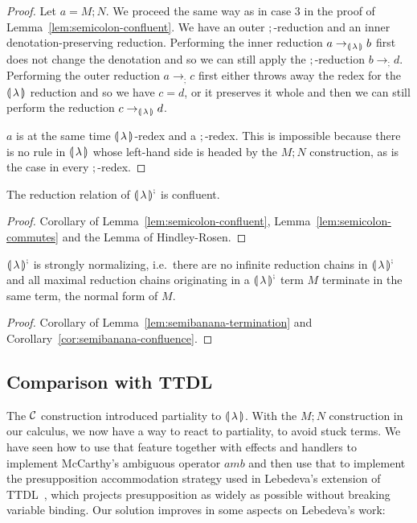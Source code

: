 \begin{proof}
    Let $a = M; N$. We proceed the same way as in case 3 in the proof of
    Lemma~\ref{lem:semicolon-confluent}. We have an outer $;$-reduction and
    an inner denotation-preserving reduction. Performing the inner
    reduction $a \to_{\llparenthesis \, \lambda \, \rrparenthesis} b$ first does not change the denotation and so
    we can still apply the $;$-reduction $b \to_; d$. Performing the outer
    reduction $a \to_; c$ first either throws away the redex for the
    ${\llparenthesis \, \lambda \, \rrparenthesis}$ reduction and so we have $c = d$, or it preserves it whole and
    then we can still perform the reduction $c \to_{\llparenthesis \, \lambda \, \rrparenthesis} d$.

  \item $a$ is at the same time ${\llparenthesis \, \lambda \, \rrparenthesis}$-redex and a $;$-redex. This is
    impossible because there is no rule in ${\llparenthesis \, \lambda \, \rrparenthesis}$ whose left-hand side is
    headed by the $M; N$ construction, as is the case in every $;$-redex.
\end{proof}

\begin{corollary}\label{cor:semibanana-confluence}
  
  The reduction relation of ${\llparenthesis \, \lambda \, \rrparenthesis}^;$ is confluent.
\end{corollary}

\begin{proof}
  Corollary of Lemma~\ref{lem:semicolon-confluent},
  Lemma~\ref{lem:semicolon-commutes} and the Lemma of Hindley-Rosen.
\end{proof}

\begin{theorem}

  ${\llparenthesis \, \lambda \, \rrparenthesis}^;$ is strongly normalizing, i.e.\ there are no infinite reduction
  chains in ${\llparenthesis \, \lambda \, \rrparenthesis}^;$ and all maximal reduction chains originating in a
  ${\llparenthesis \, \lambda \, \rrparenthesis}^;$ term $M$ terminate in the same term, the normal form of $M$.
\end{theorem}

\begin{proof}
  Corollary of Lemma~\ref{lem:semibanana-termination} and
  Corollary~\ref{cor:semibanana-confluence}.
\end{proof}


\subsection{Comparison with TTDL}
\label{ssec:comparison-ttdl}

The $\mathcal{C}$ construction introduced partiality to ${\llparenthesis \, \lambda \, \rrparenthesis}$. With the $M; N$
construction in our calculus, we now have a way to react to partiality, to
avoid stuck terms. We have seen how to use that feature together with
effects and handlers to implement McCarthy's ambiguous operator $amb$ and
then use that to implement the presupposition accommodation strategy used
in Lebedeva's extension of TTDL~\cite{lebedeva2012expression}, which
projects presupposition as widely as possible without breaking variable
binding. Our solution improves in some aspects on Lebedeva's work:

